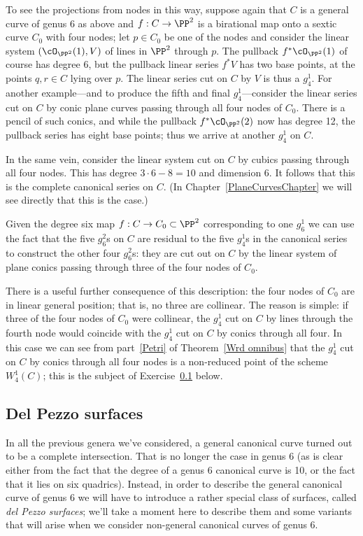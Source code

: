 To see the projections from nodes in this way,  suppose again that $C$ is a general curve of genus 6 as above and $f : C \to \PP^2$ is a birational map onto a sextic curve $C_0$ with four nodes; let $p \in C_0$ be one of the nodes and consider the linear system $(\cO_{\PP^2}(1),V)$ of lines in $\PP^2$ through $p$. The pullback $f^*\cO_{\PP^2}(1)$ of course has degree 6, but the pullback linear series $f^*V$ has two base points, at the points $q, r \in C$ lying over $p$. The linear series cut on $C$ by $V$ is thus a $g^1_4$. For another example---and to produce the fifth and final $g^1_4$---consider the linear series cut on $C$ by conic plane curves passing through all four nodes of $C_0$. There is a pencil of such conics, and while the pullback $f^*\cO_{\PP^2}(2)$ now has degree 12, the pullback series has eight base points; thus we arrive at another $g^1_4$ on $C$.

In the same vein, consider the linear system cut on $C$ by cubics passing through all four nodes. This has degree $3\cdot 6 - 8 = 10$ and dimension 6. It follows that this is the complete canonical series on $C$. (In Chapter~\ref{PlaneCurvesChapter} we will see directly that this is the case.)

Given the degree six map $f : C \to C_0 \subset \PP^2$ corresponding to one $g^1_6$ we can use the fact that the five $g^2_6$s on $C$ are residual to the five $g^1_4$s in the canonical series to construct the other four $g^2_6$s: they are cut out on $C$ by the linear system of plane conics passing through three of the four nodes of $C_0$.

There is a useful further consequence of this description: the four nodes of $C_0$ are in linear general position; that is, no three are collinear. The reason is simple: if three of the four nodes of $C_0$ were collinear, the $g^1_4$ cut on $C$ by lines through the fourth node would coincide with the $g^1_4$ cut on $C$ by conics through all four. In this case we can see from part~\ref{Petri} of Theorem~\ref{Wrd omnibus} that the $g^1_4$ cut on $C$ by conics through all four nodes is a non-reduced point of the scheme $W^1_4(C)$; this is the subject of Exercise~\ref{} below. 

\subsection{Del Pezzo surfaces}

In all the previous genera we've considered, a general canonical curve turned out to be a complete intersection. That is no longer the case in genus 6 (as is clear either from the fact that the degree of a genus 6 canonical curve is 10, or the fact that it lies on six quadrics). Instead, in order to describe the general canonical curve of genus 6 we will have to introduce a rather special class of surfaces, called \emph{del Pezzo surfaces}; we'll take a moment here to describe them and some variants that will arise when we consider non-general canonical curves of genus 6.



